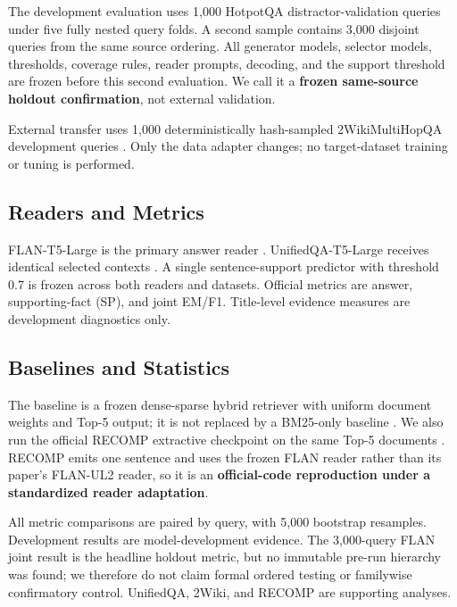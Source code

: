 The development evaluation uses 1,000 HotpotQA distractor-validation queries \citep{yang-etal-2018-hotpotqa} under five fully nested query folds. A second sample contains 3,000 disjoint queries from the same source ordering. All generator models, selector models, thresholds, coverage rules, reader prompts, decoding, and the support threshold are frozen before this second evaluation. We call it a \textbf{frozen same-source holdout confirmation}, not external validation.

External transfer uses 1,000 deterministically hash-sampled 2WikiMultiHopQA development queries \citep{ho-etal-2020-2wiki}. Only the data adapter changes; no target-dataset training or tuning is performed.

\subsection{Readers and Metrics}

FLAN-T5-Large is the primary answer reader \citep{raffel-etal-2020-t5}. UnifiedQA-T5-Large receives identical selected contexts \citep{khashabi-etal-2020-unifiedqa}. A single sentence-support predictor with threshold 0.7 is frozen across both readers and datasets. Official metrics are answer, supporting-fact (SP), and joint EM/F1. Title-level evidence measures are development diagnostics only.

\subsection{Baselines and Statistics}

The baseline is a frozen dense-sparse hybrid retriever with uniform document weights and Top-5 output; it is not replaced by a BM25-only baseline \citep{robertson-zaragoza-2009-bm25}. We also run the official RECOMP extractive checkpoint on the same Top-5 documents \citep{xu-etal-2024-recomp}. RECOMP emits one sentence and uses the frozen FLAN reader rather than its paper's FLAN-UL2 reader, so it is an \textbf{official-code reproduction under a standardized reader adaptation}.

All metric comparisons are paired by query, with 5,000 bootstrap resamples. Development results are model-development evidence. The 3,000-query FLAN joint result is the headline holdout metric, but no immutable pre-run hierarchy was found; we therefore do not claim formal ordered testing or familywise confirmatory control. UnifiedQA, 2Wiki, and RECOMP are supporting analyses.

